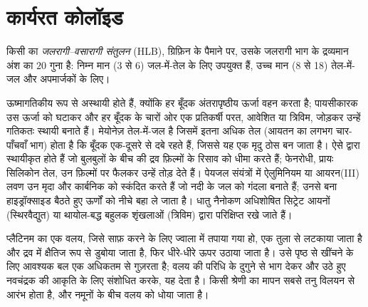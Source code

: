 \section{कार्यरत कोलॉइड}

\begin{definition}[जलरागी--वसारागी संतुलन]\label{def:b3:colloids:hlb}
किसी  का \emph{जलरागी--वसारागी संतुलन}
(HLB), ग्रिफ़िन के पैमाने पर, उसके जलरागी भाग के द्रव्यमान अंश का $20$
गुना है: निम्न मान (3 से 6) जल-में-तेल
 के लिए उपयुक्त हैं, उच्च मान (8 से 18) तेल-में-जल  और अपमार्जकों के लिए।
\end{definition}

 ऊष्मागतिकीय रूप से अस्थायी होते हैं, क्योंकि हर बूँदक
अंतरापृष्ठीय ऊर्जा वहन करता है; पायसीकारक उस ऊर्जा को घटाकर और हर बूँदक के चारों ओर
एक प्रतिकर्षी परत, आवेशित या त्रिविम, जोड़कर उन्हें गतिकतः स्थायी बनाते हैं।
मेयोनेज़ तेल-में-जल  है जिसमें इतना अधिक तेल (आयतन का लगभग चार-पाँचवाँ भाग)
होता है कि बूँदक एक-दूसरे से दबे रहते हैं, जिससे यह
एक मृदु ठोस बन जाता है।  ऐसे  द्वारा स्थायीकृत होते हैं जो बुलबुलों के बीच की
द्रव फ़िल्मों के रिसाव को धीमा करते हैं; फेनरोधी, प्रायः सिलिकोन तेल, उन
फ़िल्मों पर फैलकर उन्हें तोड़ देते हैं। पेयजल संयंत्रों में ऐलुमिनियम या आयरन(III) लवण
उन मृदा और कार्बनिक  को स्कंदित करते हैं जो नदी के जल को गंदला बनाते हैं; उनसे बना
हाइड्रॉक्साइड बैठते हुए ऊर्णों को नीचे बहा ले जाता है। धातु नैनोकण
अधिशोषित सिट्रेट आयनों (स्थिरवैद्युत) या थायोल-बद्ध
बहुलक शृंखलाओं (त्रिविम) द्वारा परिक्षिप्त रखे जाते हैं।

\begin{inthelab}[द्यू नूई वलय]
प्लैटिनम का एक वलय, जिसे साफ़ करने के लिए ज्वाला में तपाया गया हो, एक तुला से लटकाया जाता है और
द्रव में क्षैतिज रूप से डुबोया जाता है, फिर धीरे-धीरे ऊपर उठाया जाता है। उसे पृष्ठ से
खींचने के लिए आवश्यक बल एक अधिकतम से गुज़रता है; वलय की परिधि के दुगुने से
भाग देकर और उठे हुए नवचंद्रक की आकृति के लिए संशोधित करके, यह
 देता है। किसी  श्रेणी का मापन सबसे
तनु विलयन से आरंभ होता है, और नमूनों के बीच वलय को धोया जाता है।
\end{inthelab}

